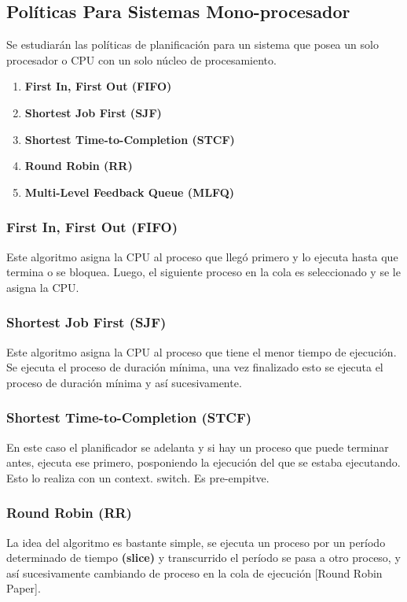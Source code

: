 \documentclass[../main.tex]{subfiles}
\begin{document}
    \subsection*{Políticas Para Sistemas Mono-procesador}
        Se estudiarán las políticas de planificación para un sistema que posea un solo procesador o CPU con un solo núcleo de procesamiento.
        \begin{enumerate}
            \item \textbf{First In, First Out (FIFO)}
            \item \textbf{Shortest Job First (SJF)}
            \item \textbf{Shortest Time-to-Completion (STCF)}
            \item \textbf{Round Robin (RR)}
            \item \textbf{Multi-Level Feedback Queue (MLFQ)}
        \end{enumerate}

        \subsubsection*{First In, First Out (FIFO)}
            Este algoritmo asigna la CPU al proceso que llegó primero y lo ejecuta hasta que termina o se bloquea. Luego, el siguiente proceso en la cola es seleccionado y se le asigna la CPU.

        \subsubsection*{Shortest Job First (SJF)} 
            Este algoritmo asigna la CPU al proceso que tiene el menor tiempo de ejecución.
            Se ejecuta el proceso de duración mínima, una vez finalizado esto se ejecuta el proceso de duración mínima y así sucesivamente.

        \subsubsection*{Shortest Time-to-Completion (STCF)}
            En este caso el planificador se adelanta y si hay un proceso que puede terminar antes, ejecuta ese primero, posponiendo la ejecución del que se estaba ejecutando. Esto lo realiza con un context.
        switch. Es pre-empitve.
        \subsubsection*{Round Robin (RR)}
            La idea del algoritmo es bastante simple, se ejecuta un proceso por un período determinado de tiempo \textbf{(slice)} y transcurrido el período se pasa a otro proceso, y así sucesivamente cambiando de proceso en la cola de ejecución [Round Robin Paper].
            
\end{document}
